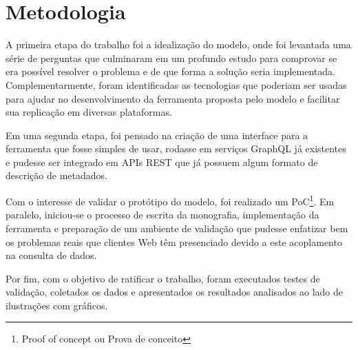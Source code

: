 \section[Metodologia]{Metodologia}

A primeira etapa do trabalho foi a idealização do modelo, onde foi levantada uma série de perguntas que culminaram em um profundo estudo para comprovar se era possível resolver o problema e de que forma a solução seria implementada. Complementarmente, foram identificadas as tecnologias que poderiam ser usadas para ajudar no desenvolvimento da ferramenta proposta pelo modelo e facilitar sua replicação em diversas plataformas.

Em uma segunda etapa, foi pensado na criação de uma interface para a ferramenta que fosse simples de usar, rodasse em serviços GraphQL já existentes e pudesse ser integrado em APIs REST que já possuem algum formato de descrição de metadados.

Com o interesse de validar o protótipo do modelo, foi realizado um PoC\footnote{
  Proof of concept ou Prova de conceito
}. Em paralelo, iniciou-se o processo de escrita da monografia, implementação da ferramenta e preparação de um ambiente de validação que pudesse enfatizar bem os problemas reais que clientes Web têm presenciado devido a este acoplamento na consulta de dados.

Por fim, com o objetivo de ratificar o trabalho, foram executados testes de validação, coletados os dados e apresentados os resultados analisados ao lado de ilustrações com gráficos.
